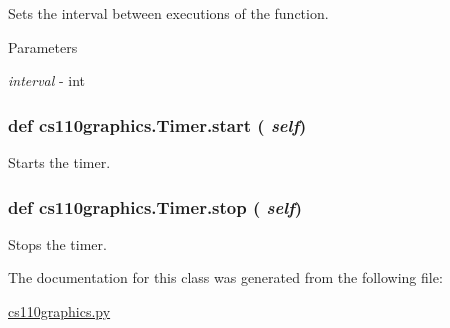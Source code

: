 Sets the interval between executions of the function. 
\begin{DoxyParams}{Parameters}
\item[{\em interval}]-\/ int \end{DoxyParams}
\hypertarget{classcs110graphics_1_1Timer_afe14c3fd66571d0186a54a4075f31b7e}{
\subsubsection[{start}]{\setlength{\rightskip}{0pt plus 5cm}def cs110graphics.Timer.start ( {\em self})}}
\label{classcs110graphics_1_1Timer_afe14c3fd66571d0186a54a4075f31b7e}


Starts the timer. \hypertarget{classcs110graphics_1_1Timer_a26ae5eb7c7da929f7e2b6e17e4b709b1}{
\subsubsection[{stop}]{\setlength{\rightskip}{0pt plus 5cm}def cs110graphics.Timer.stop ( {\em self})}}
\label{classcs110graphics_1_1Timer_a26ae5eb7c7da929f7e2b6e17e4b709b1}


Stops the timer. 

The documentation for this class was generated from the following file:\begin{DoxyCompactItemize}
\item 
\hyperlink{cs110graphics_8py}{cs110graphics.py}\end{DoxyCompactItemize}
